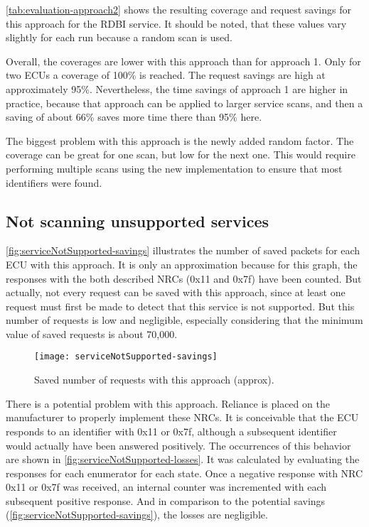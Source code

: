 \autoref{tab:evaluation-approach2} shows the resulting coverage and request savings for this approach for the RDBI service. It should be noted, that these values vary slightly for each run because a random scan is used.

Overall, the coverages are lower with this approach than for approach 1. Only for two ECUs a coverage of 100\% is reached. The request savings are high at approximately 95\%. Nevertheless, the time savings of approach 1 are higher in practice, because that approach can be applied to larger service scans, and then a saving of about 66\% saves more time there than 95\% here.

The biggest problem with this approach is the newly added random factor. The coverage can be great for one scan, but low for the next one. This would require performing multiple scans using the new implementation to ensure that most identifiers were found.

\subsection{Not scanning unsupported services}

\autoref{fig:serviceNotSupported-savings} illustrates the number of saved packets for each ECU with this approach. It is only an approximation because for this graph, the responses with the both described NRCs (0x11 and 0x7f) have been counted. But actually, not every request can be saved with this approach, since at least one request must first be made to detect that this service is not supported. But this number of requests is low and negligible, especially considering that the minimum value of saved requests is about 70,000.

\begin{figure}[htb]
    \centering
    \texttt{[image: serviceNotSupported-savings]}
    \caption{Saved number of requests with this approach (approx).}
    \label{fig:serviceNotSupported-savings}
\end{figure}

There is a potential problem with this approach. Reliance is placed on the manufacturer to properly implement these NRCs. It is conceivable that the ECU responds to an identifier with 0x11 or 0x7f, although a subsequent identifier would actually have been answered positively. The occurrences of this behavior are shown in \autoref{fig:serviceNotSupported-losses}. It was calculated by evaluating the responses for each enumerator for each state. Once a negative response with NRC 0x11 or 0x7f was received, an internal counter was incremented with each subsequent positive response.
And in comparison to the potential savings (\autoref{fig:serviceNotSupported-savings}), the losses are negligible.

